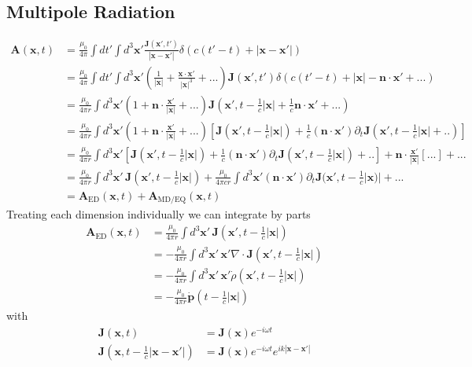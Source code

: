 \documentclass[../main.tex]{subfiles}
\begin{document}
\subsection{Multipole Radiation}
\begin{align}
\mathbf{A}(\mathbf{x},t)
&=\frac{\mu_0}{4\pi}\int dt'\int d^3\mathbf{x}'\frac{\mathbf{J}(\mathbf{x}',t')}{|\mathbf{x}-\mathbf{x}'|}\delta\left(c(t'-t)+|\mathbf{x}-\mathbf{x}'|\right)\\
&=\frac{\mu_0}{4\pi}\int dt'\int d^3\mathbf{x}'\left(\frac{1}{|\mathbf{x}|}
+\frac{\mathbf{x}\cdot\mathbf{x}'}{|\mathbf{x}|^3}
+...\right)\mathbf{J}(\mathbf{x}',t')\delta\left(c(t'-t)+|\mathbf{x}|-\mathbf{n}\cdot\mathbf{x}'+...\right)\\
&=\frac{\mu_0}{4\pi r}\int d^3\mathbf{x}'\left(1
+\mathbf{n}\cdot\frac{\mathbf{x}'}{|\mathbf{x}|}
+...\right)\mathbf{J}(\mathbf{x}',t-\frac{1}{c}|\mathbf{x}|+\frac{1}{c}\mathbf{n}\cdot\mathbf{x}'+...)\\
&=\frac{\mu_0}{4\pi r}\int d^3\mathbf{x}'\left(1
+\mathbf{n}\cdot\frac{\mathbf{x}'}{|\mathbf{x}|}
+...\right)\left[\mathbf{J}(\mathbf{x}',t-\frac{1}{c}|\mathbf{x}|)+\frac{1}{c}(\mathbf{n}\cdot\mathbf{x}')\partial_t\mathbf{J}(\mathbf{x}',t-\frac{1}{c}|\mathbf{x}|+..)\right]\\
&=\frac{\mu_0}{4\pi r}\int d^3\mathbf{x}'\left[\mathbf{J}(\mathbf{x}',t-\frac{1}{c}|\mathbf{x}|)+\frac{1}{c}(\mathbf{n}\cdot\mathbf{x}')\partial_t\mathbf{J}(\mathbf{x}',t-\frac{1}{c}|\mathbf{x}|)+..\right]+\mathbf{n}\cdot\frac{\mathbf{x}'}{|\mathbf{x}|}\left[...\right]+...\\
&=\frac{\mu_0}{4\pi r}\int d^3\mathbf{x}'\,\mathbf{J}(\mathbf{x}',t-\frac{1}{c}|\mathbf{x}|)
+\frac{\mu_0}{4\pi cr}\int d^3\mathbf{x}'(\mathbf{n}\cdot\mathbf{x}')\partial_t\mathbf{J}(\mathbf{x}',t-\frac{1}{c}|\mathbf{x})|+...\\
&=\mathbf{A}_\text{ED}(\mathbf{x},t)+\mathbf{A}_\text{MD/EQ}(\mathbf{x},t)
\end{align}
Treating each dimension individually we can integrate by parts
\begin{align}
\mathbf{A}_\text{ED}(\mathbf{x},t)
&=\frac{\mu_0}{4\pi r}\int d^3\mathbf{x}'\,\mathbf{J}(\mathbf{x}',t-\frac{1}{c}|\mathbf{x}|)\\
&=-\frac{\mu_0}{4\pi r}\int d^3\mathbf{x}'\,\mathbf{x}'\nabla\cdot\mathbf{J}(\mathbf{x}',t-\frac{1}{c}|\mathbf{x}|)\\
&=-\frac{\mu_0}{4\pi r}\int d^3\mathbf{x}'\,\mathbf{x}'\dot{\rho}(\mathbf{x}',t-\frac{1}{c}|\mathbf{x}|)\\
&=-\frac{\mu_0}{4\pi r}\dot{\mathbf{p}}( t-\frac{1}{c}|\mathbf{x}|)
\end{align}
with
\begin{align}
\mathbf{J}(\mathbf{x},t)
&=\mathbf{J}(\mathbf{x})e^{-i\omega t}\\
\mathbf{J}(\mathbf{x},t-\frac{1}{c}|\mathbf{x}-\mathbf{x}'|)
&=\mathbf{J}(\mathbf{x})e^{-i\omega t}e^{ik|\mathbf{x}-\mathbf{x}'|}
\end{align}
\end{document}
